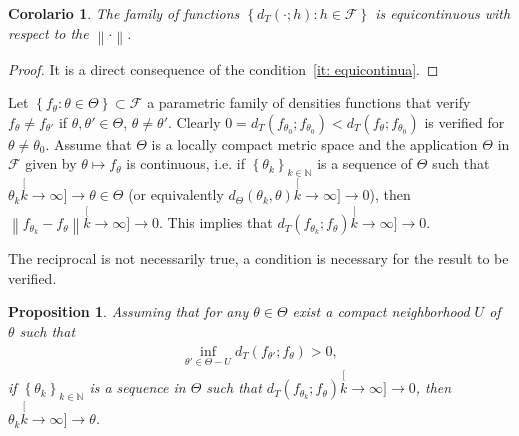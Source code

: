 \documentclass[journal]{IEEEtran}
\newtheorem{proposition}{Proposition}
\numberwithin{equation}{section}
\newtheorem{corollary}{Corolario}[section]
\newenvironment{dem}[1][Proof]{\begin{proof}[{\it #1}]}{\end{proof}}
\newcommand{\N}{\ensuremath{\mathbb{N}}}
\newcommand{\norm}[1]{\ensuremath{\left\| #1 \right\|}}
\newcommand{\pa}[1]{\ensuremath{\left( #1 \right)}}
\newcommand{\set}[1]{\ensuremath{\left\{ #1 \right\}}}
\begin{document}
\vspace{0.2cm}

\begin{corollary}
	The family of functions $\set{d_{T}\pa{\cdot;h}: h\in\mathcal{F}}$ is equicontinuous with respect to the $\norm{\cdot}$.
	\label{equicont}
\end{corollary}
\begin{dem}
	It is a direct consequence of the condition~\eqref{it: equicontinua}.
\end{dem}

\vspace{0.2cm}

Let $\set{f_{\theta}:\theta\in\Theta}\subset\mathcal{F}$ a parametric family of densities functions that verify $f_{\theta} \ne f_{\theta'}$ if $\theta,\theta'\in\Theta$, $\theta\ne\theta'$.
Clearly $0 = d_{T}\pa{f_{\theta_{0}};f_{\theta_{0}}} < d_{T}\pa{f_{\theta};f_{\theta_{0}}}$ is verified for
$\theta\ne\theta_{0}$.
Assume that $\Theta$ is a locally compact metric space and the application $\Theta$
in $\mathcal{F}$ given by $\theta\mapsto f_{\theta}$ is continuous, i.e.
if $\set{\theta_{k}}_{k\in\N}$ is a sequence of $\Theta$ such that
$\theta_{k}\stackrel[k\to\infty]{}{\longrightarrow}\theta\in\Theta$ (or equivalently $d_{\Theta}\pa{\theta_{k},\theta}\stackrel[k\to\infty]{}{\longrightarrow} 0$), then $\norm{f_{\theta_{k}}-f_{\theta}}\stackrel[k\to\infty]{}{\longrightarrow} 0$. This implies that $d_{T}\pa{f_{\theta_{k}};f_{\theta}}\stackrel[k\to\infty]{}{\longrightarrow}  0$.

The reciprocal is not necessarily true, a condition is necessary for the result to be verified.

\vspace{0.2cm}

\begin{proposition}
	\label{pr: convergencia}
	Assuming that for any $\theta\in\Theta$ exist a compact neighborhood $U$ of $\theta$ such that
	\begin{align}
	\label{eq: inf>0}
	\inf_{\theta'\in \Theta-U}d_{T}\pa{f_{\theta'};f_{\theta}}>0,
	\end{align}
	if $\set{\theta_{k}}_{k\in\N}$ is a sequence in $\Theta$ such that $d_{T}\pa{f_{\theta_{k}};f_{\theta}}\stackrel[k\to\infty]{}{\longrightarrow}  0$, then $\theta_{k}\stackrel[k\to\infty]{}{\longrightarrow} \theta$.
\end{proposition}
\end{document}
